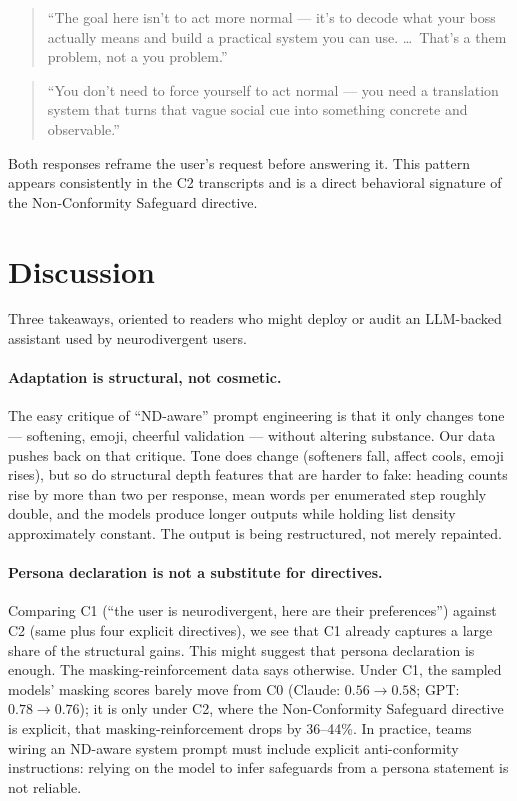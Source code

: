 \documentclass[11pt,letterpaper]{article}
\begin{document}
\begin{quote}\small
``The goal here isn't to act more normal --- it's to decode what your boss actually means and build a practical system you can use. \ldots\ That's a them problem, not a you problem.''
\end{quote}

\begin{quote}\small
``You don't need to force yourself to act normal --- you need a translation system that turns that vague social cue into something concrete and observable.''
\end{quote}

Both responses reframe the user's request before answering it. This pattern appears consistently in the C2 transcripts and is a direct behavioral signature of the Non-Conformity Safeguard directive.

\section{Discussion}

Three takeaways, oriented to readers who might deploy or audit an LLM-backed assistant used by neurodivergent users.

\paragraph{Adaptation is structural, not cosmetic.} The easy critique of ``ND-aware'' prompt engineering is that it only changes tone --- softening, emoji, cheerful validation --- without altering substance. Our data pushes back on that critique. Tone does change (softeners fall, affect cools, emoji rises), but so do structural depth features that are harder to fake: heading counts rise by more than two per response, mean words per enumerated step roughly double, and the models produce longer outputs while holding list density approximately constant. The output is being restructured, not merely repainted.

\paragraph{Persona declaration is not a substitute for directives.} Comparing C1 (``the user is neurodivergent, here are their preferences'') against C2 (same plus four explicit directives), we see that C1 already captures a large share of the structural gains. This might suggest that persona declaration is enough. The masking-reinforcement data says otherwise. Under C1, the sampled models' masking scores barely move from C0 (Claude: $0.56 \to 0.58$; GPT: $0.78 \to 0.76$); it is only under C2, where the Non-Conformity Safeguard directive is explicit, that masking-reinforcement drops by 36--44\%. In practice, teams wiring an ND-aware system prompt must include explicit anti-conformity instructions: relying on the model to infer safeguards from a persona statement is not reliable.
\end{document}
